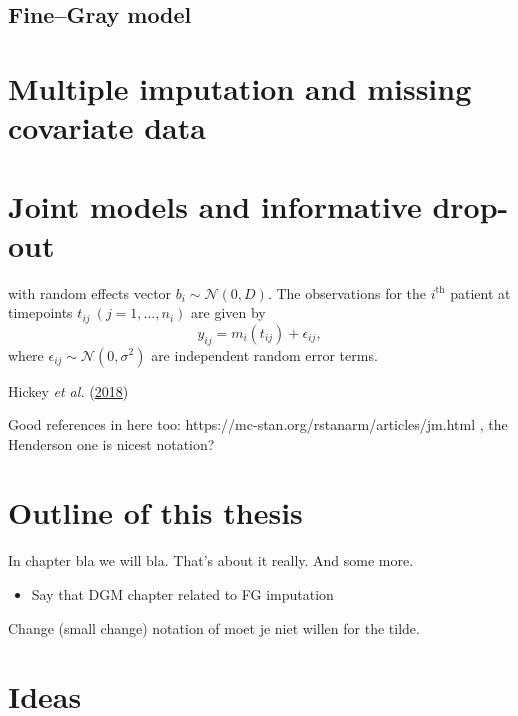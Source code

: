 \documentclass[
  letterpaper,
  DIV=11,
  numbers=noendperiod]{scrreprt}
\providecommand{\tightlist}{%
  \setlength{\itemsep}{0pt}\setlength{\parskip}{0pt}}\usepackage{longtable,booktabs,array}
\begin{document}
\hypertarget{finegray-model}{%
\subsection{Fine--Gray model}\label{finegray-model}}

\hypertarget{sec-intro-MI}{%
\section{Multiple imputation and missing covariate
data}\label{sec-intro-MI}}

\hypertarget{sec-intro-jms}{%
\section{Joint models and informative drop-out}\label{sec-intro-jms}}

with random effects vector \(b_{i} \sim \mathcal{N}(0, D)\). The
observations for the \(i^{\text{th}}\) patient at timepoints
\(t_{ij} \ (j = 1,\ldots,n_i)\) are given by \[
y_{ij} = m_i(t_{ij}) + \epsilon_{ij},
\] where \(\epsilon_{ij} \sim \mathcal{N}(0, \sigma^2)\) are independent
random error terms.

Hickey \emph{et al.}
(\protect\hyperlink{ref-hickeyComparisonJointModels2018a}{2018})

Good references in here too:
https://mc-stan.org/rstanarm/articles/jm.html , the Henderson one is
nicest notation?

\hypertarget{sec-intro-outline}{%
\section{Outline of this thesis}\label{sec-intro-outline}}

In chapter bla we will bla. That's about it really. And some more.

\begin{itemize}
\tightlist
\item
  Say that DGM chapter related to FG imputation
\end{itemize}

Change (small change) notation of moet je niet willen for the tilde.

\hypertarget{ideas}{%
\section*{Ideas}\label{ideas}}

\end{document}
